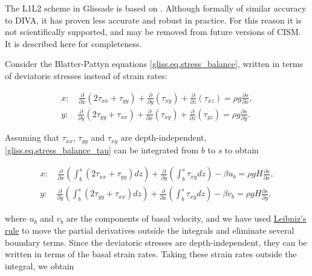 {The L1L2 scheme in Glissade is based on \citet{Perego2012}.
Although formally of similar accuracy to DIVA, it has proven less accurate and robust
in practice.  For this reason it is not scientifically supported, and may be removed
from future versions of CISM.  It is described here for completeness.

Consider the Blatter-Pattyn equations \eqref{gliss.eq.stress_balance}, written in
terms of deviatoric stresses instead of strain rates:

\begin{equation}
  \label{gliss.eq.stress_balance_tau}
  \begin{split}
    x: \quad \frac{\partial }{\partial x}\left( 2 \tau_{xx} + \tau_{yy} \right)
           + \frac{\partial }{\partial y}\left( \tau_{xy} \right)
           + \frac{\partial }{\partial z}\left( \tau_{xz} \right)
           = \rho g\frac{\partial s}{\partial x}, \\
    y: \quad \frac{\partial }{\partial y}\left( 2 \tau_{yy} + \tau_{xx} \right)
           + \frac{\partial }{\partial x}\left( \tau_{xy} \right)
           + \frac{\partial }{\partial z}\left( \tau_{yz} \right)
           = \rho g\frac{\partial s}{\partial y}.
  \end{split}
\end{equation}

\noindent
Assuming that $\tau_{xx}$, $\tau_{yy}$ and $\tau_{xy}$ are depth-independent,
\eqref{gliss.eq.stress_balance_tau} can be integrated from $b$ to $s$ to obtain

\begin{equation}
  \label{gliss.eq.stress_balance_tau_integrated}
  \begin{split}
    x: \quad \frac{\partial }{\partial x} \left( \int_b^s (2 \tau_{xx} + \tau_{yy}) dz \right)
           + \frac{\partial }{\partial y} \left( \int_b^s {\tau_{xy} dz} \right)
           - \beta u_b = \rho g H \frac{\partial s}{\partial x}, \\
    y: \quad \frac{\partial }{\partial y} \left( \int_b^s (2 \tau_{yy} + \tau_{xx}) dz \right)
           + \frac{\partial }{\partial x} \left( \int_b^s {\tau_{xy} dz} \right)
           - \beta v_b = \rho g H \frac{\partial s}{\partial y},
  \end{split}
\end{equation}

\noindent
where $u_b$ and $v_b$ are the components of basal velocity, and we have used
\href{http://en.wikipedia.org/wiki/Leibniz_integral_rule}{Leibniz's rule}
to move the partial derivatives outside the integrals and eliminate several boundary terms.
Since the deviatoric stresses are depth-independent, they can be written in terms of the
basal strain rates. Taking these strain rates outside the integral, we obtain

}
